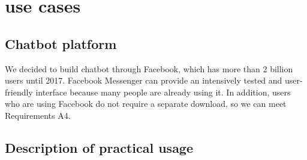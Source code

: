 \section{use cases}

\subsection{Chatbot platform}
We decided to build chatbot through Facebook, which has more than 2 billion users until 2017. Facebook Messenger can provide an intensively tested and user-friendly interface because many people are already using it. In addition, users who are using Facebook do not require a separate download, so we can meet Requirements A4.

\subsection{Description of practical usage}

